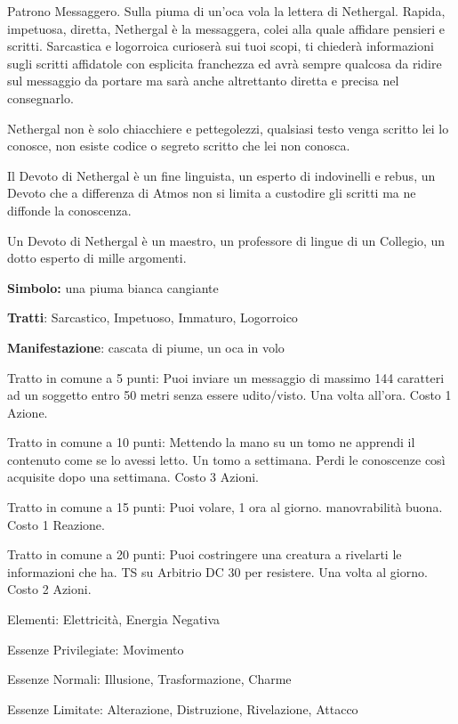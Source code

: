 \documentclass[a4paper,11pt,twoside,openany]{book}
\begin{document}
{\label{nethergal}

Patrono Messaggero. Sulla piuma di un'oca vola la lettera di Nethergal. Rapida, impetuosa, diretta, Nethergal è la messaggera, colei alla quale affidare pensieri e scritti. Sarcastica e logorroica curioserà sui tuoi scopi, ti chiederà informazioni sugli scritti affidatole con esplicita franchezza ed avrà sempre qualcosa da ridire sul messaggio da portare ma sarà anche altrettanto diretta e precisa nel consegnarlo. 

Nethergal non è solo chiacchiere e pettegolezzi, qualsiasi testo venga scritto lei lo conosce, non esiste codice o segreto scritto che lei non conosca.

Il Devoto di Nethergal è un fine linguista, un esperto di indovinelli e rebus, un Devoto che a differenza di Atmos non si limita a custodire gli scritti ma ne diffonde la conoscenza.

Un Devoto di Nethergal è un maestro, un professore di lingue di un Collegio, un dotto esperto di mille argomenti.

\textbf{Simbolo:} una piuma bianca cangiante

\textbf{Tratti}: Sarcastico, Impetuoso, Immaturo, Logorroico

\textbf{Manifestazione}: cascata di piume, un oca in volo

\bigskip

Tratto in comune a 5 punti: Puoi inviare un messaggio di massimo 144 caratteri ad un soggetto entro 50 metri senza essere udito/visto. Una volta all'ora. Costo 1 Azione.

Tratto in comune a 10 punti: Mettendo la mano su un tomo ne apprendi il contenuto come se lo avessi letto. Un tomo a settimana. Perdi le conoscenze così acquisite dopo una settimana. Costo 3 Azioni.

Tratto in comune a 15 punti: Puoi volare, 1 ora al giorno. manovrabilità buona. Costo 1 Reazione.

Tratto in comune a 20 punti: Puoi costringere una creatura a rivelarti le informazioni che ha. TS su Arbitrio DC 30 per resistere. Una volta al giorno. Costo 2 Azioni.

\bigskip

Elementi: Elettricità, Energia Negativa

\bigskip

Essenze Privilegiate: Movimento

Essenze Normali: Illusione, Trasformazione, Charme

Essenze Limitate: Alterazione, Distruzione, Rivelazione, Attacco

}
\end{document}

